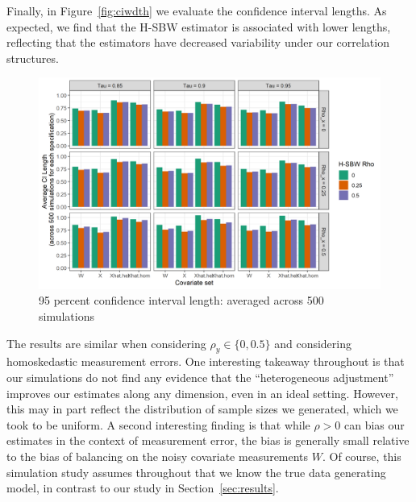 Finally, in Figure~\ref{fig:ciwdth} we evaluate the confidence interval lengths. As expected, we find that the H-SBW estimator is associated with lower lengths, reflecting that the estimators have decreased variability under our correlation structures.

\begin{figure}[H]\label{fig:simcoverage2}
\begin{center}
    \caption{95 percent confidence interval length: averaged across 500 simulations}\label{fig:simcoverage2}
    \includegraphics[scale=0.5]{01_Plots/ci-length-plot.png}
\end{center}
\end{figure}

The results are similar when considering $\rho_y \in \{0, 0.5\}$ and considering homoskedastic measurement errors. One interesting takeaway throughout is that our simulations do not find any evidence that the ``heterogeneous adjustment'' improves our estimates along any dimension, even in an ideal setting. However, this may in part reflect the distribution of sample sizes we generated, which we took to be uniform. A second interesting finding is that while $\rho > 0$ can bias our estimates in the context of measurement error, the bias is generally small relative to the bias of balancing on the noisy covariate measurements $W$. Of course, this simulation study assumes throughout that we know the true data generating model, in contrast to our study in Section~\ref{sec:results}.